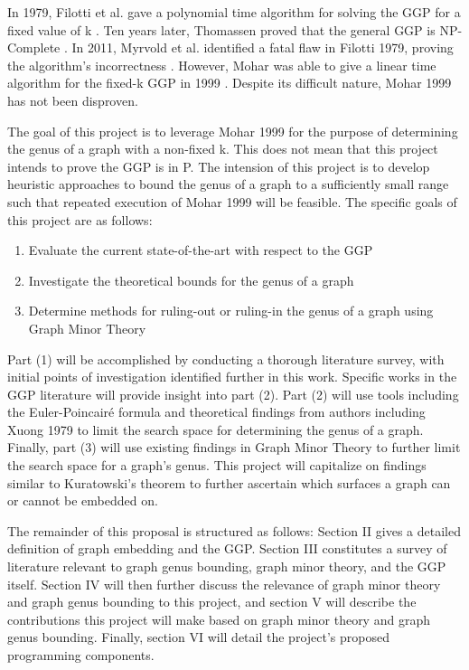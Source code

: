 \documentclass[12pt,conference]{IEEEtran}
\begin{document}
In 1979, Filotti et al. gave a polynomial time algorithm for solving the GGP for a fixed value of k \cite{filotti}. Ten years later, Thomassen proved that the general GGP is NP-Complete \cite{thomassen}. In 2011, Myrvold et al. identified a fatal flaw in Filotti 1979, proving the algorithm's incorrectness \cite{myrvold-kocay}. However, Mohar was able to give a linear time algorithm for the fixed-k GGP in 1999 \cite{mohar}. Despite its difficult nature, Mohar 1999 has not been disproven. 

The goal of this project is to leverage Mohar 1999 for the purpose of determining the genus of a graph with a non-fixed k. This does not mean that this project intends to prove the GGP is in P. The intension of this project is to develop heuristic approaches to bound the genus of a graph to a sufficiently small range such that repeated execution of Mohar 1999 will be feasible. The specific goals of this project are as follows:

\begin{enumerate}
\item Evaluate the current state-of-the-art with respect to the GGP
\item Investigate the theoretical bounds for the genus of a graph
\item Determine methods for ruling-out or ruling-in the genus of a graph using Graph Minor Theory
\end{enumerate}

Part (1) will be accomplished by conducting a thorough literature survey, with initial points of investigation identified further in this work. Specific works in the GGP literature will provide insight into part (2). Part (2) will use tools including the Euler-Poincair\'e formula and theoretical findings from authors including Xuong 1979 \cite{xuong} to limit the search space for determining the genus of a graph. Finally, part (3) will use existing findings in Graph Minor Theory to further limit the search space for a graph's genus. This project will capitalize on findings similar to Kuratowski's theorem to further ascertain which surfaces a graph can or cannot be embedded on.

The remainder of this proposal is structured as follows: Section II gives a detailed definition of graph embedding and the GGP. Section III constitutes a survey of literature relevant to graph genus bounding, graph minor theory, and the GGP itself. Section IV will then further discuss the relevance of graph minor theory and graph genus bounding to this project, and section V will describe the contributions this project will make based on graph minor theory and graph genus bounding. Finally, section VI will detail the project's proposed programming components.
\end{document}
